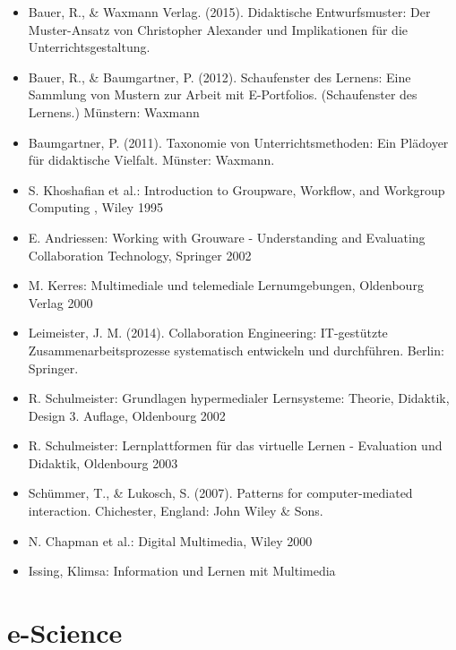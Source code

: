 \begin{itemize}
\tightlist
\item
  Bauer, R., \& Waxmann Verlag. (2015). Didaktische Entwurfsmuster: Der
  Muster-Ansatz von Christopher Alexander und Implikationen für die
  Unterrichtsgestaltung.
\item
  Bauer, R., \& Baumgartner, P. (2012). Schaufenster des Lernens: Eine
  Sammlung von Mustern zur Arbeit mit E-Portfolios. (Schaufenster des
  Lernens.) Münstern: Waxmann
\item
  Baumgartner, P. (2011). Taxonomie von Unterrichtsmethoden: Ein
  Plädoyer für didaktische Vielfalt. Münster: Waxmann.
\item
  S. Khoshafian et al.: Introduction to Groupware, Workflow, and
  Workgroup Computing , Wiley 1995
\item
  E. Andriessen: Working with Grouware - Understanding and Evaluating
  Collaboration Technology, Springer 2002
\item
  M. Kerres: Multimediale und telemediale Lernumgebungen, Oldenbourg
  Verlag 2000
\item
  Leimeister, J. M. (2014). Collaboration Engineering: IT-gestützte
  Zusammenarbeitsprozesse systematisch entwickeln und durchführen.
  Berlin: Springer.
\item
  R. Schulmeister: Grundlagen hypermedialer Lernsysteme: Theorie,
  Didaktik, Design 3. Auflage, Oldenbourg 2002
\item
  R. Schulmeister: Lernplattformen für das virtuelle Lernen - Evaluation
  und Didaktik, Oldenbourg 2003
\item
  Schümmer, T., \& Lukosch, S. (2007). Patterns for computer-mediated
  interaction. Chichester, England: John Wiley \& Sons.
\item
  N. Chapman et al.: Digital Multimedia, Wiley 2000
\item
  Issing, Klimsa: Information und Lernen mit Multimedia
\end{itemize}

\chapter{e-Science\label{/mi-2017/modulbeschreibungen-master/MA_SC_WPF_eScience}}\label{e-sciencepathlabelmi-2017modulbeschreibungen-mastermaux5fscux5fwpfux5fescience}

